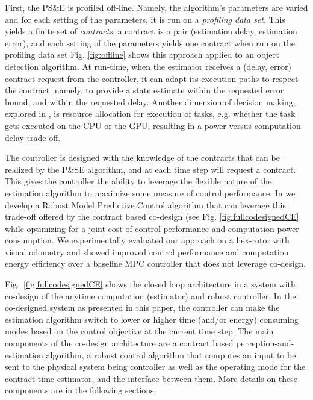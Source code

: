 First, the PS\&E is profiled off-line.
Namely, the algorithm's parameters are varied and for each setting of the parameters, it is run on a \emph{profiling data set}. 
This yields a finite set of \emph{contracts}: a contract is a pair (estimation delay, estimation error), and each setting of the parameters yields one contract when run on the profiling data set
Fig. \ref{fig:offline} shows this approach applied to an object detection algorithm.
At run-time, when the estimator receives a (delay, error) contract request from the controller, it can adapt its execution paths to respect the contract, namely, to provide a state estimate within the requested error bound, and within the requested delay.
Another dimension of decision making, explored in \cite{Complex15}, is resource allocation for execution of tasks, e.g. whether the task gets executed on the CPU or the GPU, resulting in a power versus computation delay trade-off.

The controller is designed with the knowledge of the contracts that can be realized by the P\&SE algorithm, and at each time step will request a contract.
This gives the controller the ability to leverage the flexible nature of the estimation algorithm to maximize some measure of control performance. %
In \cite{RTSS15} we develop a Robust Model Predictive Control algorithm that can leverage this trade-off offered by the contract based co-design (see Fig. \ref{fig:fullcodesignedCE} while optimizing for a joint cost of control performance and computation power consumption. We experimentally evaluated our approach on a hex-rotor with visual odometry and showed improved control performance and computation energy efficiency over a baseline MPC controller that does not leverage co-design.


Fig.~\ref{fig:fullcodesignedCE} shows the closed loop architecture in a system with co-design of the anytime computation (estimator) and robust controller.
In the co-designed system as presented in this paper, the controller can make the estimation algorithm switch to lower or higher time (and/or energy) consuming modes based on the control objective at the current time step.
The main components of the co-design architecture are a contract based perception-and-estimation algorithm, a robust control algorithm that computes an input to be sent to the physical system being controller as well as the operating mode for the contract time estimator, and the interface between them. More details on these components are in the following sections.




